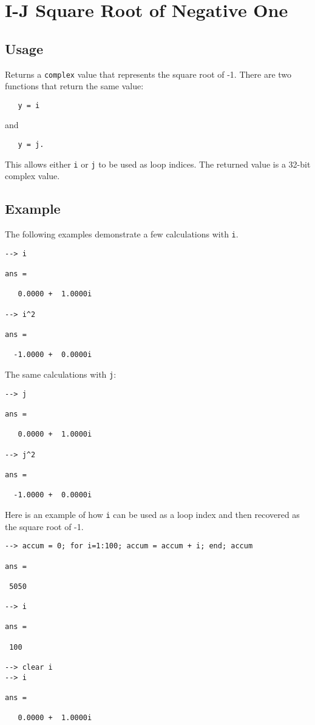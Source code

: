 \section{I-J Square Root of Negative One}

\subsection{Usage}

Returns a \verb|complex| value that represents the square root of -1.  There are two
functions that return the same value:
\begin{verbatim}
   y = i
\end{verbatim}
and 
\begin{verbatim}
   y = j.
\end{verbatim}
This allows either \verb|i| or \verb|j| to be used as loop indices.  The returned value is a 32-bit complex value.
\subsection{Example}

The following examples demonstrate a few calculations with \verb|i|.
\begin{verbatim}
--> i

ans = 

   0.0000 +  1.0000i 

--> i^2

ans = 

  -1.0000 +  0.0000i 
\end{verbatim}
The same calculations with \verb|j|:
\begin{verbatim}
--> j

ans = 

   0.0000 +  1.0000i 

--> j^2

ans = 

  -1.0000 +  0.0000i 
\end{verbatim}
Here is an example of how \verb|i| can be used as a loop index and then recovered as the square root of -1.
\begin{verbatim}
--> accum = 0; for i=1:100; accum = accum + i; end; accum

ans = 

 5050 

--> i

ans = 

 100 

--> clear i
--> i

ans = 

   0.0000 +  1.0000i 
\end{verbatim}
